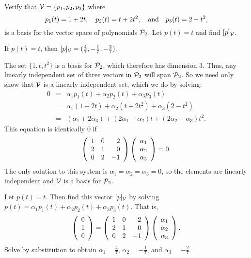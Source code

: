 \documentclass{ximera}
\begin{document}
\begin{exercise} \label{c7.1.4}
Verify that ${\cal V}= \{p_1,p_2,p_3\}$ where
\[
p_1(t)=1+2t, \quad p_2(t)=t+2t^2, \quad\mbox{and}\quad p_3(t)=2-t^2,
\]
is a basis for the vector space of polynomials ${\cal P}_2$.
Let $p(t)=t$ and find $[p]_{\cal V}$.

\begin{solution}

\ans If $p(t) = t$, then
$[p]_{\cal V} = (\frac{4}{7}, -\frac{1}{7}, -\frac{2}{7})$.


\soln The set $\{1,t,t^2\}$ is a basis for ${\cal P}_2$, which therefore has dimension 3. 
Thus, any linearly independent set of three vectors
in ${\cal P}_2$ will span ${\cal P}_2$.  So we need only show that
${\cal V}$ is a linearly independent set, which we do by solving:
\[
\begin{array}{rcl}
0 & = & \alpha_1p_1(t) + \alpha_2p_2(t) + \alpha_3p_3(t) \\
& = & \alpha_1(1 + 2t) + \alpha_2(t + 2t^2) + \alpha_3(2 - t^2) \\
& = & (\alpha_1 + 2\alpha_3) + (2\alpha_1 + \alpha_2)t +
(2\alpha_2 - \alpha_3)t^2. \end{array}
\]
This equation is identically $0$ if
\[
\left(\begin{array}{rrr} 1 & 0 & 2 \\ 2 & 1 & 0 \\ 0 & 2 & -1\end{array}\right)\left(\begin{array}{r} \alpha_1 \\ \alpha_2 \\ \alpha_3\end{array}\right) = 0.
\]
The only solution to this system is $\alpha_1 = \alpha_2 = \alpha_3
 = 0$, so the elements are linearly independent and ${\cal V}$ is
a basis for ${\cal P}_2$.

\para Let $p(t) = t$.  Then find this vector $[p]_{\cal V}$ by solving
$p(t) = \alpha_1p_1(t) + \alpha_2p_2(t) + \alpha_3p_3(t)$. 
That is,
\[ \left(\begin{array}{r} 0 \\ 1 \\ 0\end{array}\right) = \left(\begin{array}{rrr} 1 & 0 & 2 \\ 2 & 1 & 0 \\ 0 & 2 & -1\end{array}\right)
\left(\begin{array}{r} \alpha_1 \\ \alpha_2 \\ \alpha_3\end{array}\right). \]
Solve by substitution to obtain $\alpha_1 = \frac{4}{7}$, $\alpha_2
= -\frac{1}{7}$, and $\alpha_3 = -\frac{2}{7}$.

\end{solution}
\end{exercise}
\end{document}
